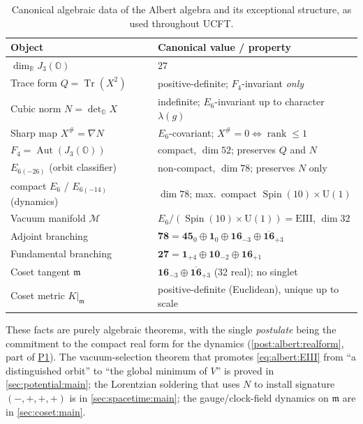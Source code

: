 \documentclass[11pt]{article}
\renewcommand{\arraystretch}{1.18}
\theoremstyle{plain}
\theoremstyle{definition}
\theoremstyle{remark}
\begin{document}
\begin{table}[ht]
\centering
\renewcommand{\arraystretch}{1.3}
\begin{tabular}{ll}
\hline
Object & Canonical value / property \\
\hline
$\dim_{\mathbb{R}} J_{3}(\mathbb{O})$ & $27$ \\
Trace form $Q=\operatorname{Tr}(X^{2})$ & positive-definite; $F_{4}$-invariant \emph{only} \\
Cubic norm $N=\det_{\mathbb{O}}X$ & indefinite; $E_{6}$-invariant up to character $\lambda(g)$ \\
Sharp map $X^{\#}=\nabla N$ & $E_{6}$-covariant; $X^{\#}=0\Leftrightarrow\operatorname{rank}\le1$ \\
$F_{4}=\operatorname{Aut}(J_{3}(\mathbb{O}))$ & compact, $\dim 52$; preserves $Q$ and $N$ \\
$E_{6(-26)}$ (orbit classifier) & non-compact, $\dim 78$; preserves $N$ only \\
compact $E_{6}$ / $E_{6(-14)}$ (dynamics) & $\dim 78$; max.\ compact $\operatorname{Spin}(10)\times\mathrm{U}(1)$ \\
Vacuum manifold $\mathcal{M}$ & $E_{6}/(\operatorname{Spin}(10)\times\mathrm{U}(1))=\mathrm{EIII}$, $\dim 32$ \\
Adjoint branching & $\mathbf{78}=\mathbf{45}_{0}\oplus\mathbf{1}_{0}\oplus\mathbf{16}_{-3}\oplus\overline{\mathbf{16}}_{+3}$ \\
Fundamental branching & $\mathbf{27}=\mathbf{1}_{+4}\oplus\mathbf{10}_{-2}\oplus\mathbf{16}_{+1}$ \\
Coset tangent $\mathfrak{m}$ & $\mathbf{16}_{-3}\oplus\overline{\mathbf{16}}_{+3}$ (32 real); no singlet \\
Coset metric $K|_{\mathfrak{m}}$ & positive-definite (Euclidean), unique up to scale \\
\hline
\end{tabular}
\caption{Canonical algebraic data of the Albert algebra and its
exceptional structure, as used throughout UCFT.}
\label{tab:albert:summary}
\end{table}

These facts are purely algebraic theorems, with the single
\emph{postulate} being the commitment to the compact real form for the
dynamics (\autoref{post:albert:realform}, part of
\hyperref[post:potential:P1]{P1}). The vacuum-selection theorem that
promotes \eqref{eq:albert:EIII} from ``a distinguished orbit'' to ``the
global minimum of $V$'' is proved in \autoref{sec:potential:main}; the
Lorentzian soldering that uses $N$ to install signature $(-,+,+,+)$ is in
\autoref{sec:spacetime:main}; the gauge/clock-field dynamics on
$\mathfrak{m}$ are in \autoref{sec:coset:main}.
\end{document}
